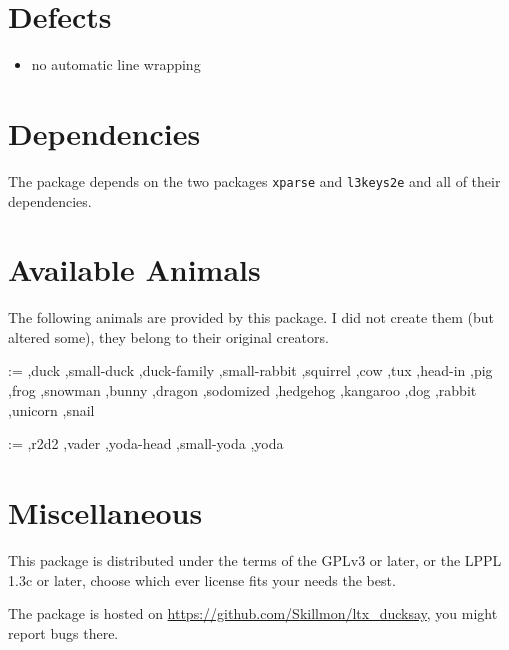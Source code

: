 \documentclass[a4paper,10pt]{article}
\makeatletter
\newcommand*{\availableAnimal}[1]{\@for\cs:=#1\do{%
  \ifx\cs\@empty\else%
    \rlap{\expandafter\ducksay\expandafter[\cs]{\cs}}\hfill\mbox{}\\[1ex]%
  \fi%
}}
\makeatother
\begin{document}
\section{Defects}%
{\reversemarginpar{}}
\begin{itemize}
  \item no automatic line wrapping
\end{itemize}
\section{Dependencies}%
The package depends on the two packages \texttt{xparse} and \texttt{l3keys2e}
and all of their dependencies.
\section{Available Animals}\label{sec:animals}%
The following animals are provided by this package. I did not create them (but
altered some), they belong to their original creators.
\bgroup
\footnotesize
\begin{multicols}{2}
\availableAnimal{%
  ,duck%
  ,small-duck%
  ,duck-family%
  ,small-rabbit%
  ,squirrel%
  ,cow%
  ,tux%
  ,head-in%
  ,pig%
  ,frog%
  ,snowman%
  ,bunny%
  ,dragon%
  ,sodomized%
  ,hedgehog%
  ,kangaroo%
  ,dog%
  ,rabbit%
  ,unicorn%
  ,snail%
}\end{multicols}\begin{multicols}{2}
\availableAnimal{%
  ,r2d2%
  ,vader%
  ,yoda-head%
  ,small-yoda%
  ,yoda%
}%
\end{multicols}
\egroup
\section{Miscellaneous}%
This package is distributed under the terms of the GPLv3 or later, or the LPPL
1.3c or later, choose which ever license fits your needs the best.

The package is hosted on \url{https://github.com/Skillmon/ltx_ducksay}, you
might report bugs there.
\clearpage
\thispagestyle{empty}
\bgroup
\Huge
\mbox{}\vfill
\centering
{}
\vfill
\hfill{}
\egroup
\end{document}

